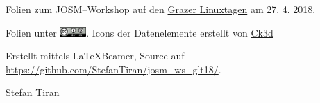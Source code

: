 \documentclass{beamer}
\begin{document}
\begin{frame}
Folien zum JOSM--Workshop auf den
\href{http://http://linuxtage.at/}{Grazer Linuxtagen} am 27. 4. 2018.
\vspace{1cm}

Folien unter \includegraphics[width=1cm]{cc-by-sa.png}.
Icons der Datenelemente erstellt von \href{https://wiki.openstreetmap.org/wiki/User:Ck3d}{Ck3d}
\vspace{1cm}

Erstellt mittels \LaTeX Beamer, Source auf \url{https://github.com/StefanTiran/josm_ws_glt18/}.
\vspace{1cm}

\href{mailto:osm@stefantiran.at}{Stefan Tiran}
\end{frame}
\end{document}
